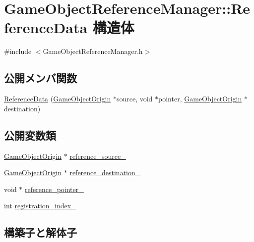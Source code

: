 \hypertarget{struct_game_object_reference_manager_1_1_reference_data}{}\section{Game\+Object\+Reference\+Manager\+:\+:Reference\+Data 構造体}
\label{struct_game_object_reference_manager_1_1_reference_data}


{\ttfamily \#include $<$Game\+Object\+Reference\+Manager.\+h$>$}

\subsection*{公開メンバ関数}
\begin{DoxyCompactItemize}
\item 
\mbox{\hyperlink{struct_game_object_reference_manager_1_1_reference_data_a5d4c9f7f0a18fd8fac8cc27b4e4d0bed}{Reference\+Data}} (\mbox{\hyperlink{class_game_object_origin}{Game\+Object\+Origin}} $\ast$source, void $\ast$pointer, \mbox{\hyperlink{class_game_object_origin}{Game\+Object\+Origin}} $\ast$destination)
\end{DoxyCompactItemize}
\subsection*{公開変数類}
\begin{DoxyCompactItemize}
\item 
\mbox{\hyperlink{class_game_object_origin}{Game\+Object\+Origin}} $\ast$ \mbox{\hyperlink{struct_game_object_reference_manager_1_1_reference_data_a156ed734d7471b18cce1e2f7196852ad}{reference\+\_\+source\+\_\+}}
\item 
\mbox{\hyperlink{class_game_object_origin}{Game\+Object\+Origin}} $\ast$ \mbox{\hyperlink{struct_game_object_reference_manager_1_1_reference_data_af3949232d1720f355eeafe602fc653d2}{reference\+\_\+destination\+\_\+}}
\item 
void $\ast$ \mbox{\hyperlink{struct_game_object_reference_manager_1_1_reference_data_a360dfcbaa8421065a9d3b9d963ed576b}{reference\+\_\+pointer\+\_\+}}
\item 
int \mbox{\hyperlink{struct_game_object_reference_manager_1_1_reference_data_a36154b84fbcaa168786a74854cfda609}{registration\+\_\+index\+\_\+}}
\end{DoxyCompactItemize}


\subsection{構築子と解体子}
\mbox{\label{struct_game_object_reference_manager_1_1_reference_data_a5d4c9f7f0a18fd8fac8cc27b4e4d0bed}} 

